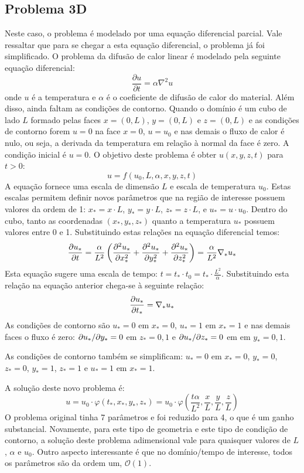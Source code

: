\subsection{Problema 3D}
Neste caso, o problema é modelado por uma equação diferencial parcial. Vale ressaltar que para se chegar a esta equação diferencial, o problema já foi simplificado. O problema da difusão de calor linear é modelado pela seguinte equação diferencial:
\[
\frac{\partial u}{\partial t} = \alpha\nabla^2 u
\]
onde $u$ é a temperatura e $\alpha$ é o coeficiente de difusão de calor do material. Além disso, ainda faltam as condições de contorno. Quando o domínio é um cubo de lado $L$ formado pelas faces $x=(0,L)$, $y=(0,L)$ e $z=(0,L)$ e as condições de contorno forem $u=0$ na face $x=0$, $u=u_0$ e nas demais o fluxo de calor é nulo, ou seja, a derivada da temperatura em relação à normal da face é zero. A condição inicial é $u=0$. O objetivo deste problema é obter $u(x,y,z,t)$ para $t>0$:
\[
u = f(u_0, L, \alpha, x, y, z, t)
\]
A equação fornece uma escala de dimensão $L$ e escala de temperatura $u_0$. Estas escalas permitem definir novos parâmetros que na região de interesse possuem valores da ordem de 1: $x_* = x\cdot L$, $y_* = y\cdot L$, $z_* = z\cdot L$, e $u_* = u\cdot u_0$. Dentro do cubo, tanto as coordenadas $(x_*, y_*, z_*)$ quanto a temperatura $u_*$  possuem valores entre 0 e 1. Substituindo estas relações na equação diferencial temos:
\[
\frac{\partial u_*}{\partial t} = \frac{\alpha}{L^2}\left(\frac{\partial^2 u_*}{\partial x_*^2} + \frac{\partial^2 u_*}{\partial y_*^2} + \frac{\partial^2 u_*}{\partial z_*^2} \right) = \frac{\alpha}{L^2} \nabla_* u_*
\]
Esta equação sugere uma escala de tempo: $t = t_*\cdot t_0 = t_* \cdot \frac{L^2}{\alpha}$. Substituindo esta relação na equação anterior chega-se à seguinte relação:
\[
\frac{\partial u_*}{\partial t_*} =\nabla_* u_*
\]
As condições de contorno são $u_*=0$ em $x_*=0$, $u_*=1$ em $x_*=1$ e nas demais faces o fluxo é zero: $\partial u_*/\partial y_* = 0$ em $z_*=0,1$ e $\partial u_*/\partial z_* = 0$ em em $y_*=0,1$.


As condições de contorno também se simplificam: $u_*=0$ em $x_*=0$, $y_*=0$, $z_*=0$, $y_*=1$, $z_*=1$ e $u_* = 1$ em $x_* = 1$. 

A solução deste novo problema é:
\[
u = u_0 \cdot \varphi(t_*, x_*, y_*, z_*) = u_0\cdot\varphi\left(\frac{t\alpha}{L^2}, \frac{x}{L}, 
 \frac{y}{L} , \frac{z}{L}\right)
\]
O problema original tinha 7 parâmetros e foi reduzido para 4, o que é um ganho substancial. Novamente, para este tipo de geometria e este tipo de condição de contorno, a solução deste problema adimensional vale para quaisquer valores de $L$, $\alpha$ e $u_0$. Outro aspecto interessante é que no domínio/tempo de interesse, todos os parâmetros são da ordem um, $\mathcal{O}(1)$.

